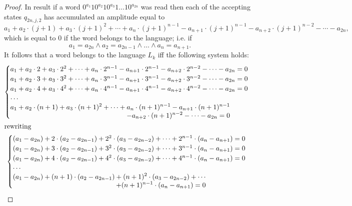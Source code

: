 \documentclass{llncs}
\begin{document}
\begin{definicija}
\begin{proof}
In result if a word $0^{a_1}10^{a_2}10^{a_3}1\ldots 10^{a_{2n}}$ was read then each of the accepting states $q_{2n,j,2}$ has accumulated an amplitude equal to
\[
	a_1 + a_2 \cdot (j + 1) + a_3 \cdot (j + 1)^2 + \cdots + a_n \cdot (j + 1)^{n - 1} - a_{n+1} \cdot (j + 1)^{n - 1} - a_{n+2} \cdot (j + 1)^{n - 2} - \cdots - a_{2n},
\]
which is equal to $0$ if the word belongs to the language; i.e. if
\[
	a_1 = a_{2n} \wedge a_2 = a_{2n-1} \wedge \ldots \wedge a_n = a_{n+1}.
\]
It follows that a word belongs to the language $L_k$ iff the following system holds:
\begin{gather*}
\allowdisplaybreaks
	\begin{cases}
		a_1 + a_2 \cdot 2 + a_3 \cdot 2^2 + \cdots + a_n \cdot 2^{n - 1} - a_{n+1} \cdot 2^{n - 1} - a_{n+2} \cdot 2^{n - 2} - \cdots - a_{2n} = 0 \\
		a_1 + a_2 \cdot 3 + a_3 \cdot 3^2 + \cdots + a_n \cdot 3^{n - 1} - a_{n+1} \cdot 3^{n - 1} - a_{n+2} \cdot 3^{n - 2} - \cdots - a_{2n} = 0\\
		a_1 + a_2 \cdot 4 + a_3 \cdot 4^2 + \cdots + a_n \cdot 4^{n - 1} - a_{n+1} \cdot 4^{n - 1} - a_{n+2} \cdot 4^{n - 2} - \cdots - a_{2n} = 0\\
		\cdots \\
		\begin{split}
		a_1 + a_2 \cdot (n + 1) + a_3 \cdot (n + 1)^2 + \cdots + a_n \cdot (n + 1)^{n - 1} - a_{n+1} \cdot (n + 1)^{n - 1} \\
		\qquad- a_{n+2} \cdot (n + 1)^{n - 2} - \cdots - a_{2n} = 0\\
		\end{split}
	\end{cases}\\
\intertext{rewriting}
	\begin{cases}
		(a_1 - a_{2n}) + 2 \cdot (a_2 - a_{2n-1}) + 2^2 \cdot (a_3 - a_{2n-2}) + \cdots + 2^{n - 1} \cdot (a_n - a_{n+1}) = 0\\
		(a_1 - a_{2n}) + 3 \cdot (a_2 - a_{2n-1}) + 3^2 \cdot (a_3 - a_{2n-2}) + \cdots + 3^{n - 1} \cdot (a_n - a_{n+1}) = 0\\
		(a_1 - a_{2n}) + 4 \cdot (a_2 - a_{2n-1}) + 4^2 \cdot (a_3 - a_{2n-2}) + \cdots + 4^{n - 1} \cdot (a_n - a_{n+1}) = 0\\
		\cdots \\
		\begin{split}
		(a_1 - a_{2n}) + (n + 1) \cdot (a_2 - a_{2n-1}) + (n + 1)^2 \cdot (a_3 - a_{2n-2}) + \cdots \\
		\qquad+ (n + 1)^{n - 1} \cdot (a_n - a_{n+1}) = 0\\
		\end{split}	
	\end{cases}
\end{gather*}


\end{proof}
\end{definicija}
\end{document}
